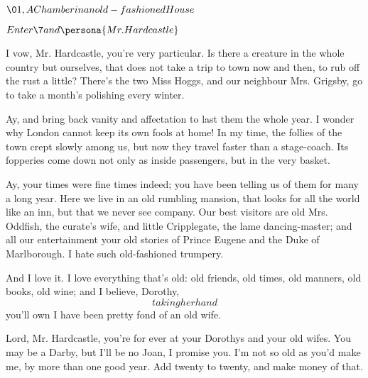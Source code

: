 \documentclass{book}
\begin{document}
\Drama
\Prosa
{}





\spatium* {1\leading}

\thispagestyle {empty}
\pagestyle {MainMatterPage}

\Act


\(\01, A Chamber in an old-fashioned House\)


\(Enter \7 and \persona{Mr. Hardcastle}\)


\7  I vow, Mr. Hardcastle, you're very particular.  Is
there a creature in the whole country but ourselves, that does not take
a trip to town now and then, to rub off the rust a little?  There's the
two Miss Hoggs, and our neighbour Mrs. Grigsby, go to take a month's
polishing every winter.

\3  Ay, and bring back vanity and affectation to last them the
whole year.  I wonder why London cannot keep its own fools at home!  In
my time, the follies of the town crept slowly among us, but now they
travel faster than a stage-coach.  Its fopperies come down not only as
inside passengers, but in the very basket.

\7  Ay, your times were fine times indeed; you have been
telling us of them for many a long year.  Here we live in an old
rumbling mansion, that looks for all the world like an inn, but that we
never see company.  Our best visitors are old Mrs. Oddfish, the
curate's wife, and little Cripplegate, the lame dancing-master; and all
our entertainment your old stories of Prince Eugene and the Duke of
Marlborough.  I hate such old-fashioned trumpery.

\3  And I love it.  I love everything that's old: old
friends, old times, old manners, old books, old wine; and I believe,
Dorothy, \[taking her hand\] you'll own I have been pretty fond of an old
wife.

\7  Lord, Mr. Hardcastle, you're for ever at your
Dorothys and your old wifes.  You may be a Darby, but I'll be no Joan,
I promise you.  I'm not so old as you'd make me, by more than one good
year.  Add twenty to twenty, and make money of that.
\end{document}

